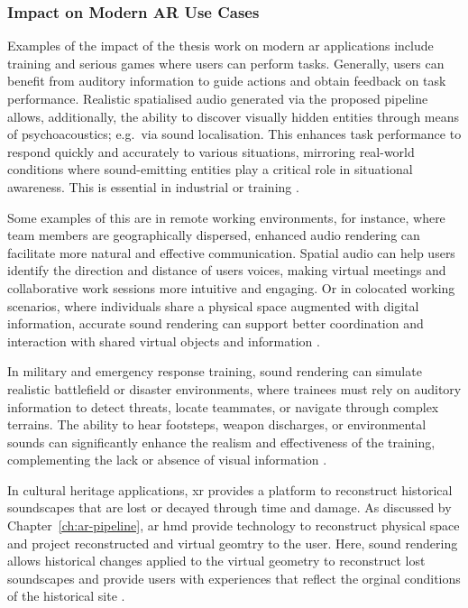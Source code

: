 \subsubsection{Impact on Modern AR Use Cases}
Examples of the impact of the thesis work on modern \acrshort{ar} applications include training and serious games where users can perform tasks. Generally, users can benefit from auditory information to guide actions and obtain feedback on task performance. Realistic spatialised audio generated via the proposed pipeline allows, additionally, the ability to discover visually hidden entities through means of psychoacoustics; e.g.\ via sound localisation. This enhances task performance to respond quickly and accurately to various situations, mirroring real-world conditions where sound-emitting entities play a critical role in situational awareness. This is essential in industrial \citep{machala2022application} or training \citep{soltani2020augmented}.\par
Some examples of this are in remote working environments, for instance, where team members are geographically dispersed, enhanced audio rendering can facilitate more natural and effective communication. Spatial audio can help users identify the direction and distance of users voices, making virtual meetings and collaborative work sessions more intuitive and engaging. Or in colocated working scenarios, where individuals share a physical space augmented with digital information, accurate sound rendering can support better coordination and interaction with shared virtual objects and information \citep{park2022metaverse,al2022review}.\par
In military and emergency response training, sound rendering can simulate realistic battlefield or disaster environments, where trainees must rely on auditory information to detect threats, locate teammates, or navigate through complex terrains. The ability to hear footsteps, weapon discharges, or environmental sounds can significantly enhance the realism and effectiveness of the training, complementing the lack or absence of visual information \citep{vine2023training, ahir2020application}.\par
In cultural heritage applications, \acrshort{xr} provides a platform to reconstruct historical soundscapes that are lost or decayed through time and damage. As discussed by Chapter~\ref{ch:ar-pipeline}, \acrshort{ar} \acrshort{hmd} provide technology to reconstruct physical space and project reconstructed and virtual geomtry to the user. Here, sound rendering allows historical changes applied to the virtual geometry to reconstruct lost soundscapes and provide users with experiences that reflect the orginal conditions of the historical site \citep{katz2020past, schofield2018viking}.

